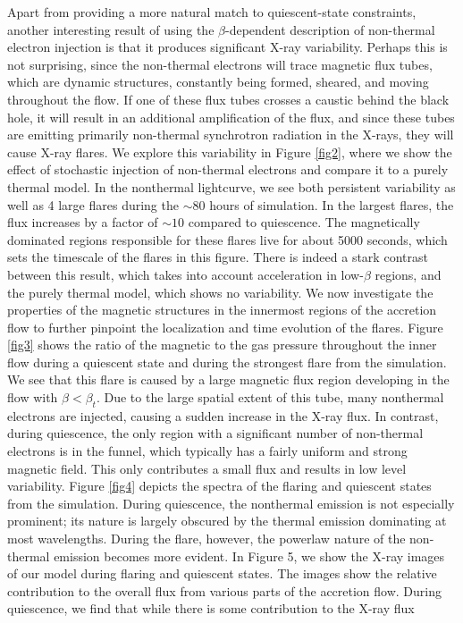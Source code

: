Apart from providing a more natural match to quiescent-state constraints, another interesting result
of using the $\beta$-dependent description of non-thermal electron injection is that it produces significant X-ray
variability. Perhaps this is not surprising, since the non-thermal electrons will trace magnetic flux tubes,
which are dynamic structures, constantly being formed, sheared, and moving throughout the flow. If one of these
flux tubes crosses a caustic behind the black hole, it will result in an additional amplification of the flux, and
since these tubes are emitting primarily non-thermal synchrotron radiation in the X-rays, they will cause X-ray
flares. We explore this variability in Figure \ref{fig2}, where we show the effect of stochastic injection of non-thermal electrons and compare it to a purely thermal model. In the nonthermal lightcurve, we see both persistent variability as
well as 4 large flares during the $\sim$80 hours of simulation. In the largest flares, the flux increases by a factor of $\sim 10$
compared to quiescence. The magnetically dominated regions responsible for these flares live for about 5000
seconds, which sets the timescale of the flares in this figure. There is indeed a stark contrast between this
result, which takes into account acceleration in low-$\beta$ regions, and the purely thermal model, which shows no variability.  We now investigate the properties of the magnetic structures in the innermost regions of the accretion flow
to further pinpoint the localization and time evolution of the flares. Figure \ref{fig3} shows the ratio of the magnetic
to the gas pressure throughout the inner flow during a
quiescent state and during the strongest flare from the
simulation. We see that this flare is caused by a large
magnetic flux region developing in the flow with $\beta < \beta_t$.
Due to the large spatial extent of this tube, many nonthermal electrons are injected, causing a sudden increase
in the X-ray flux. In contrast, during quiescence, the only
region with a significant number of non-thermal electrons
is in the funnel, which typically has a fairly uniform and
strong magnetic field. This only contributes a small flux
and results in low level variability.
Figure \ref{fig4} depicts the spectra of the flaring and quiescent
states from the simulation. During quiescence, the nonthermal emission is not especially prominent; its nature is
largely obscured by the thermal emission dominating at
most wavelengths. During the flare, however, the powerlaw nature of the non-thermal emission becomes more
evident.
In Figure 5, we show the X-ray images of our model
during flaring and quiescent states. The images show
the relative contribution to the overall flux from various
parts of the accretion flow. During quiescence, we find
that while there is some contribution to the X-ray flux

